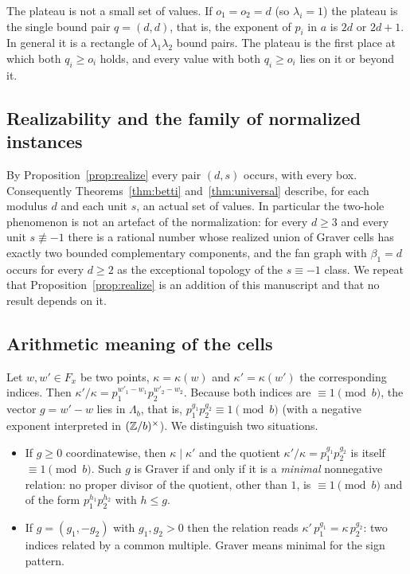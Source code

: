 \begin{remark}[Sizes]
The plateau is not a small set of values. If $o_1=o_2=d$ (so $\lambda_i=1$) the plateau is the single bound pair $q=(d,d)$, that is, the exponent of $p_i$ in $a$ is $2d$ or $2d+1$. In general it is a rectangle of $\lambda_1\lambda_2$ bound pairs. The plateau is the first place at which both $q_i\ge o_i$ holds, and every value with both $q_i\ge o_i$ lies on it or beyond it.
\end{remark}

\subsection{Realizability and the family of normalized instances}

By Proposition~\ref{prop:realize} every pair $(d,s)$ occurs, with every box. Consequently Theorems~\ref{thm:betti} and~\ref{thm:universal} describe, for each modulus $d$ and each unit $s$, an actual set of values. In particular the two-hole phenomenon is not an artefact of the normalization: for every $d\ge3$ and every unit $s\not\equiv-1$ there is a rational number whose realized union of Graver cells has exactly two bounded complementary components, and the fan graph with $\beta_1=d$ occurs for every $d\ge2$ as the exceptional topology of the $s\equiv-1$ class. We repeat that Proposition~\ref{prop:realize} is an addition of this manuscript and that no result depends on it.

\subsection{Arithmetic meaning of the cells}\label{sec:cell-arith}

Let $w,w'\in F_x$ be two points, $\kappa=\kappa(w)$ and $\kappa'=\kappa(w')$ the corresponding indices. Then $\kappa'/\kappa=p_1^{w'_1-w_1}p_2^{w'_2-w_2}$. Because both indices are $\equiv1\pmod b$, the vector $g=w'-w$ lies in $\Lambda_b$, that is, $p_1^{g_1}p_2^{g_2}\equiv1\pmod b$ (with a negative exponent interpreted in $(\mathbb Z/b)^\times$). We distinguish two situations.

\begin{itemize}
\item If $g\ge0$ coordinatewise, then $\kappa\mid\kappa'$ and the quotient $\kappa'/\kappa=p_1^{g_1}p_2^{g_2}$ is itself $\equiv1\pmod b$. Such $g$ is Graver if and only if it is a \emph{minimal} nonnegative relation: no proper divisor of the quotient, other than $1$, is $\equiv1\pmod b$ and of the form $p_1^{h_1}p_2^{h_2}$ with $h\le g$.
\item If $g=(g_1,-g_2)$ with $g_1,g_2>0$ then the relation reads $\kappa'\,p_1^{g_1}=\kappa\,p_2^{g_2}$: two indices related by a common multiple. Graver means minimal for the sign pattern.
\end{itemize}

